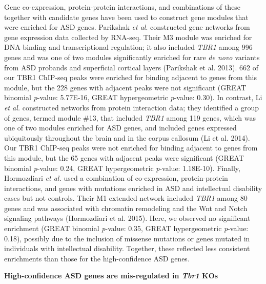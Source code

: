 \documentclass[]{article}
\begin{document}
Gene co-expression, protein-protein interactions, and combinations of
these together with candidate genes have been used to construct gene
modules that were enriched for ASD genes. Parikshak \emph{et al}.
constructed gene networks from gene expression data collected by
RNA-seq. Their M3 module was enriched for DNA binding and
transcriptional regulation; it also included \emph{TBR1} among 996 genes
and was one of two modules significantly enriched for rare \emph{de
novo} variants from ASD probands and superficial cortical layers
(Parikshak et al. 2013). 662 of our TBR1 ChIP-seq peaks were enriched
for binding adjacent to genes from this module, but the 228 genes with
adjacent peaks were not significant (GREAT binomial \emph{p}-value:
5.77E-16, GREAT hypergeometric \emph{p}-value: 0.30). In contrast, Li
\emph{et al.} constructed networks from protein interaction data; they
identified a group of genes, termed module \#13, that included
\emph{TBR1} among 119 genes, which was one of two modules enriched for
ASD genes, and included genes expressed ubiquitously throughout the
brain and in the corpus callosum (Li et al. 2014). Our TBR1 ChIP-seq
peaks were not enriched for binding adjacent to genes from this module,
but the 65 genes with adjacent peaks were significant (GREAT binomial
\emph{p}-value: 0.24, GREAT hypergeometric \emph{p}-value: 1.18E-10).
Finally, Hormozdiari \emph{et al.} used a combination of co-expression,
protein-protein interactions, and genes with mutations enriched in ASD
and intellectual disability cases but not controls. Their M1 extended
network included \emph{TBR1} among 80 genes and was associated with
chromatin remodeling and the Wnt and Notch signaling pathways
(Hormozdiari et al. 2015). Here, we observed no significant enrichment
(GREAT binomial \emph{p}-value: 0.35, GREAT hypergeometric
\emph{p}-value: 0.18), possibly due to the inclusion of missense
mutations or genes mutated in individuals with intellectual disability.
Together, these reflected less consistent enrichments than those for the
high-confidence ASD genes.

\textbf{High-confidence ASD genes are mis-regulated in \emph{Tbr1} KOs }
\end{document}
